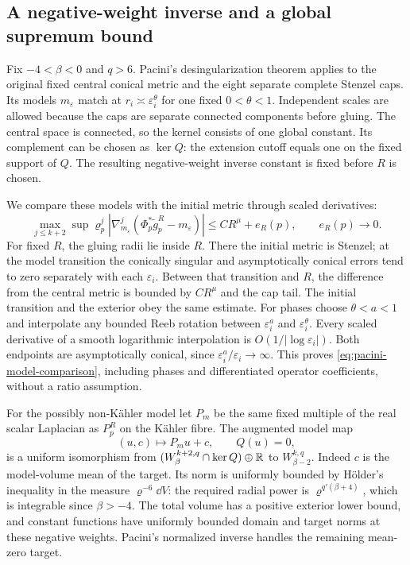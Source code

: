 \subsection{A negative-weight inverse and a global supremum bound}

Fix $-4<\beta<0$ and $q>6$. Pacini's
desingularization theorem
\cite[Definition~11.6 and Theorem~12.3(1)]{pacini}
applies to the original fixed central conical metric
and the eight separate complete Stenzel caps.
Its models $m_\varepsilon$ match at
$r_i\asymp\varepsilon_i^\theta$ for one fixed
$0<\theta<1$. Independent scales are allowed because
the caps are separate connected components before
gluing. The central space is connected, so the
kernel consists of one global constant. Its
complement can be chosen as $\ker Q$: the extension
cutoff equals one on the fixed support of $Q$.
The resulting negative-weight inverse constant is
fixed before $R$ is chosen.

We compare these models with the initial metric
through scaled derivatives:
\begin{equation}\label{eq:pacini-model-comparison}
 \max_{j\le k+2}\sup\varrho_p^j
 |\nabla_{m_\varepsilon}^j
       (\Phi_p^*\widetilde g_p^R-m_\varepsilon)|
 \le CR^\mu+e_R(p),\qquad e_R(p)\longrightarrow0.
\end{equation}
For fixed $R$, the gluing radii lie inside $R$.
There the initial metric is Stenzel; at the model
transition the conically singular and asymptotically
conical errors tend to zero separately with each
$\varepsilon_i$. Between that transition and $R$,
the difference from the central metric is bounded by
$CR^\mu$ and the cap tail. The initial transition
and the exterior obey the same estimate.
For phases choose $\theta<a<1$ and interpolate any
bounded Reeb rotation between
$\varepsilon_i^a$ and $\varepsilon_i^\theta$.
Every scaled derivative of a smooth logarithmic
interpolation is $O(1/|\log\varepsilon_i|)$.
Both endpoints are asymptotically conical, since
$\varepsilon_i^a/\varepsilon_i\to\infty$.
This proves \eqref{eq:pacini-model-comparison},
including phases and differentiated operator
coefficients, without a ratio assumption.

For the possibly non-Kähler model let $P_m$ be
the same fixed multiple of the real scalar
Laplacian as $P_p^R$ on the Kähler fibre.
The augmented model map
\[
 (u,c)\longmapsto P_m u+c,\qquad Q(u)=0,
\]
is a uniform isomorphism from
$(W^{k+2,q}_\beta\cap\ker Q)\oplus\mathbb R$
to $W^{k,q}_{\beta-2}$. Indeed $c$ is the
model-volume mean of the target. Its norm is
uniformly bounded by Hölder's inequality in the
measure $\varrho^{-6}\dd V$: the required radial
power is $\varrho^{q'(\beta+4)}$, which is
integrable since $\beta>-4$. The total volume
has a positive exterior lower bound, and constant
functions have uniformly bounded domain and target
norms at these negative weights. Pacini's
normalized inverse handles the remaining mean-zero
target.

